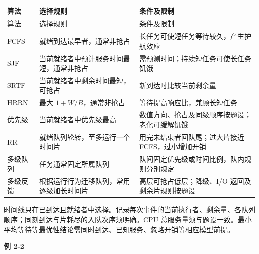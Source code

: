 \par\smallskip
\begin{wideblock}
{\fontsize{9.3}{12}\selectfont\setlength{\tabcolsep}{2.5pt}\setlength{\LTleft}{0pt}\setlength{\LTright}{0pt}
\begin{longtable}{@{}>{\raggedright\arraybackslash}p{}>{\raggedright\arraybackslash}p{}>{\raggedright\arraybackslash}p{}@{}}
\toprule
算法 & 选择规则 & 条件及限制 \\

\midrule\endfirsthead\toprule
算法 & 选择规则 & 条件及限制 \\

\midrule\endhead\bottomrule\endfoot
FCFS & 就绪到达最早者，通常非抢占 & 长任务可使短任务等待较久，产生护航效应 \\

SJF & 当前就绪者中预计服务时间最短，通常非抢占 & 需预测时间；持续短任务可使长任务饥饿 \\

SRTF & 当前就绪者中剩余时间最短，可抢占 & 新到达时比较当前剩余量 \\

HRRN & 最大 \(1+W/B\)，通常非抢占 & 等待提高响应比，兼顾长短任务 \\

优先级 & 当前就绪者中优先级最高 & 数值方向、抢占及同级顺序按题设；老化可缓解饥饿 \\

RR & 就绪队列轮转，至多运行一个时间片 & 用完未结束者回队尾；过大片接近 FCFS，过小增加开销 \\

多级队列 & 任务通常固定所属队列 & 队间固定优先级或时间比例，队内规则分别规定 \\

多级反馈 & 根据运行行为迁移队列，常用逐级加长时间片 & 高层可抢占低层；降级、I/O 返回及剩余片规则按题设 \\

\end{longtable}}
\end{wideblock}
\par\smallskip

时间线只在已到达且就绪者中选择。记录每次事件的当前执行者、剩余量、各队列顺序；同刻到达与片耗尽的入队次序须明确。CPU 总服务量须与题设一致。最小平均等待等最优性结论需同时到达、已知服务、忽略开销等相应模型前提。

\par\medskip{}\noindent\hypertarget{OS02-E02}{}\label{OS02-E02}\textbf{例 2-2}\par\nobreak\smallskip


